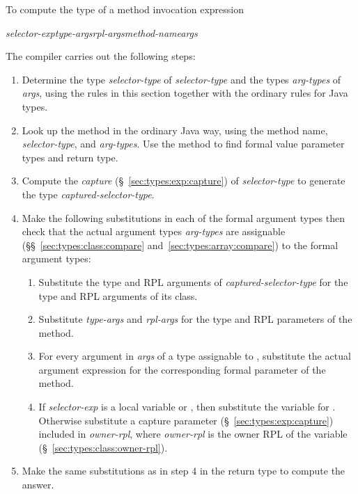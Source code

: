   To compute the type of a
method invocation expression
%
\begin{description}
\item \emph{selector-exp}\emph{type-args}\kwd{,}\emph{rpl-args}\kwd{>}\emph{method-name}\kwd{(}\emph{args}\kwd{)}
\end{description}
%
The compiler carries out the following steps:
%
\begin{enumerate}
%
\item Determine the type \emph{selector-type} of \emph{selector-type}
  and the types \emph{arg-types} of \emph{args}, using the rules in
  this section together with the ordinary rules for Java types.
%
\item Look up the method in the ordinary Java way, using the method
  name, \emph{selector-type}, and \emph{arg-types}.  Use the method to
  find formal value parameter types and return type.
%
\item Compute the \emph{capture} (\S~\ref{sec:types:exp:capture}) of
  \emph{selector-type} to generate the type
  \emph{captured-selector-type}.
%
\item Make the following substitutions in each of the formal argument
  types then check that the actual argument types \emph{arg-types} are
  assignable (\S\S~\ref{sec:types:class:compare}
  and~\ref{sec:types:array:compare}) to the formal argument types:
%
\begin{enumerate}
%
\item Substitute the type and RPL arguments of
  \emph{captured-selector-type} for the type and RPL arguments of its
  class.
\item Substitute \emph{type-args} and \emph{rpl-args} for the type and
  RPL parameters of the method.
\item For every argument in \emph{args} of a type assignable to
  , substitute the actual argument expression for the
  corresponding formal parameter of the method.
\item If \emph{selector-exp} is a  local variable or
  , then substitute the variable for .  Otherwise
  substitute a capture parameter (\S~\ref{sec:types:exp:capture})
  included in \emph{owner-rpl}\kwd{:*}, where \emph{owner-rpl} is the
  owner RPL of the variable (\S~\ref{sec:types:class:owner-rpl}).
%
\end{enumerate}
%
\item Make the same substitutions as in step 4 in the return type to
  compute the answer.
%
\end{enumerate}

